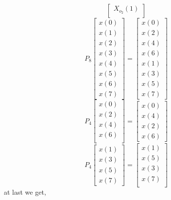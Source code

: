 \documentclass[journal,12pt,twocolumn]{IEEEtran}
\renewcommand\thesection{\arabic{section}}
\begin{document}
\begin{enumerate}[label=\thesection.\arabic*.,ref=\thesection.\theenumi]
\begin{equation}
\begin{bmatrix}
X_{o_{2}}(1) \\ 
\end{bmatrix}
\end{equation}
\begin{equation}
P_{8}
\begin{bmatrix}
x(0) \\ 
x(1) \\ 
x(2) \\ 
x(3) \\ 
x(4) \\ 
x(5) \\
x(6) \\
x(7)
\end{bmatrix}
 = 
\begin{bmatrix}
x(0) \\ 
x(2) \\ 
x(4) \\ 
x(6) \\
x(1) \\ 
x(3) \\ 
x(5) \\
x(7)
\end{bmatrix}
\end{equation}
\begin{equation}
P_{4}
\begin{bmatrix}
x(0) \\ 
x(2) \\ 
x(4) \\ 
x(6) \\
\end{bmatrix}
 = 
\begin{bmatrix}
x(0) \\ 
x(4) \\ 
x(2) \\
x(6)
\end{bmatrix}
\end{equation}
\begin{equation}
P_{4}
\begin{bmatrix}
x(1) \\ 
x(3) \\ 
x(5) \\
x(7)
\end{bmatrix}
 = 
\begin{bmatrix}
x(1) \\ 
x(5) \\ 
x(3) \\ 
x(7) \\
\end{bmatrix}
\end{equation}
at last we get,
\begin{equation}

\end{equation}
\end{enumerate}
\end{document}
